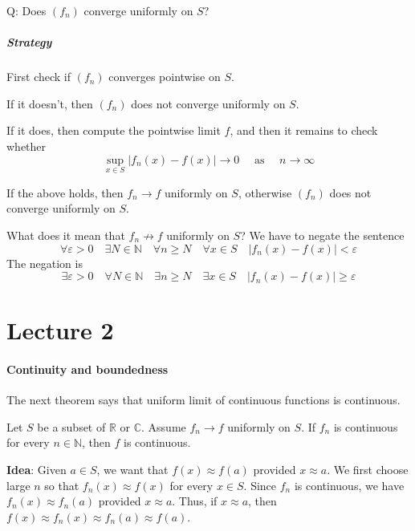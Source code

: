 \documentclass[a4paper]{article}
\begin{document}
Q: Does $\left(f_{n}\right)$ converge uniformly on $S ?$
\subsubsection*{Strategy}
First check if $\left(f_{n}\right)$ converges pointwise on $S$.

If it doesn't, then $\left(f_{n}\right)$ does not converge uniformly on $S$.

If it does, then compute the pointwise limit $f$, and then it remains to check whether
\[
\sup _{x \in S}\left|f_{n}(x)-f(x)\right| \rightarrow 0 \quad \text { as } \quad n \rightarrow \infty
\]

If the above holds, then $f_{n} \rightarrow f$ uniformly on $S$, otherwise $\left(f_{n}\right)$ does not converge uniformly on $S$.

\begin{remark}
    What does it mean that $f_{n} \not \rightarrow f$ uniformly on $S$? We have to negate the sentence
    \[
    \forall \varepsilon>0 \quad \exists N \in \mathbb{N} \quad \forall n \geqslant N \quad \forall x \in S \quad\left|f_{n}(x)-f(x)\right|<\varepsilon
    \]
    The negation is
    \[
    \exists \varepsilon>0 \quad \forall N \in \mathbb{N} \quad \exists n \geqslant N \quad \exists x \in S \quad\left|f_{n}(x)-f(x)\right| \geqslant \varepsilon
    \]
\end{remark}
\newpage
\part*{Lecture 2}
\subsection{Continuity and boundedness}
The next theorem says that uniform limit of continuous functions is continuous.
\begin{theorem}\label{thm:1}
    Let $S$ be a subset of $\mathbb{R}$ or $\mathbb{C}$. Assume $f_{n} \rightarrow f$ uniformly on $S$. If $f_{n}$ is continuous for every $n \in \mathbb{N}$, then $f$ is continuous.
\end{theorem}

\textsf{\textbf{Idea}}: Given $a \in S$, we want that $f(x) \approx f(a)$ provided $x \approx a$. We first choose large $n$ so that $f_{n}(x) \approx f(x)$ for every $x \in S$. Since $f_{n}$ is continuous, we have $f_{n}(x) \approx f_{n}(a)$ provided $x \approx a$. Thus, if $x \approx a$, then $f(x) \approx f_{n}(x) \approx f_{n}(a) \approx f(a)$.
\end{document}
